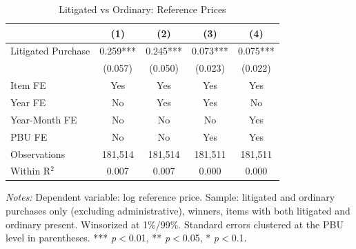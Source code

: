 \begin{table}[ht]
  \centering
  \caption{Litigated vs Ordinary: Reference Prices}
  \label{tab:t2_lit_ref_prices}
  \small
  \begin{threeparttable}
  \begin{tabular}{lcccc}
    \hline\hline
    & (1) & (2) & (3) & (4) \\
    \hline
    Litigated Purchase & 0.259*** & 0.245*** & 0.073*** & 0.075*** \\
     & (0.057) & (0.050) & (0.023) & (0.022) \\[3pt]
    \hline
    Item FE & Yes & Yes & Yes & Yes \\
    Year FE & No & Yes & Yes & No \\
    Year-Month FE & No & No & No & Yes \\
    PBU FE & No & No & Yes & Yes \\
    Observations & 181,514 & 181,514 & 181,511 & 181,511 \\
    Within R$^2$ & 0.007 & 0.007 & 0.000 & 0.000 \\
    \hline\hline
  \end{tabular}
  \begin{tablenotes}
    \small
    \item \textit{Notes:} Dependent variable: log reference price. Sample: litigated and ordinary purchases only (excluding administrative), winners, items with both litigated and ordinary present. Winsorized at 1\%/99\%. Standard errors clustered at the PBU level in parentheses. *** \textit{p}$<$0.01, ** \textit{p}$<$0.05, * \textit{p}$<$0.1.
  \end{tablenotes}
  \end{threeparttable}
\end{table}
